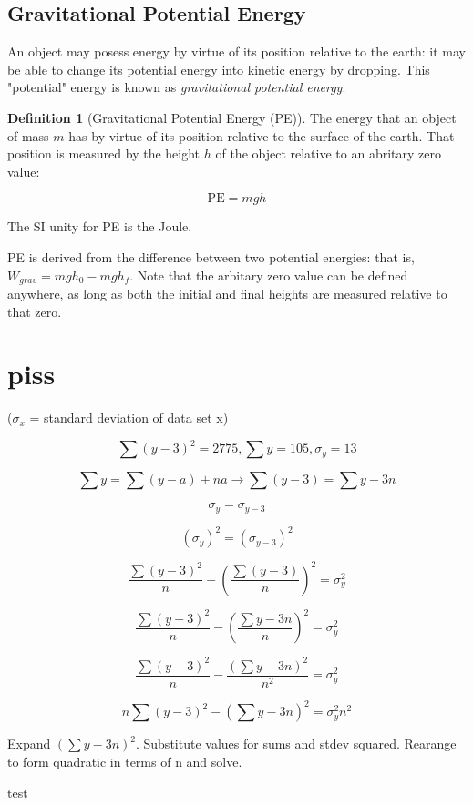 \documentclass[12pt, a4paper]{article}
\theoremstyle{definition}
\newtheorem{definition}{Definition}
\begin{document}
\subsection{Gravitational Potential Energy}
An object may posess energy by virtue of its position relative to the earth: it may be able to change its potential energy into kinetic energy by dropping.
This "potential" energy is known as \emph{gravitational potential energy}.

\begin{definition}[Gravitational Potential Energy (PE)]
    The energy that an object of mass $m$ has by virtue of its position relative to the surface of the earth. That position is measured by the height $h$ of the object relative to an
    abritary zero value:

    \[\mathrm{PE} = mgh\]

    The SI unity for PE is the Joule.
\end{definition}

PE is derived from the difference between two potential energies: that is, $W_{grav} = mgh_0 - mgh_f$.
Note that the arbitary zero value can be defined anywhere, as long as both the initial and final heights are measured relative to that zero.

\section{piss}

($\sigma_x$ = standard deviation of data set x)

\[\sum (y - 3)^2 = 2775, \sum y = 105, \sigma_y = 13\]

\[\sum y = \sum(y - a) + na \rightarrow \sum (y - 3) = \sum y - 3n\]

\[\sigma_y = \sigma_{y - 3}\]

\[(\sigma_y)^2 = (\sigma_{y - 3})^2\]

\[\frac{\sum (y - 3)^2}{n} - (\frac{\sum{(y - 3)}}{n})^2 = \sigma_y^2\]

\[\frac{\sum (y - 3)^2}{n} - (\frac{\sum y - 3n}{n})^2 = \sigma_y^2\]

\[\frac{\sum (y - 3)^2}{n} - \frac{(\sum y - 3n)^2}{n^2} = \sigma_y^2\]

\[n\sum (y - 3)^2 - (\sum y - 3n)^2 = \sigma_y^2n^2\]

Expand $(\sum y - 3n)^2$. Substitute values for sums and stdev squared. Rearange to form quadratic in terms of n and solve.

test
\end{document}
